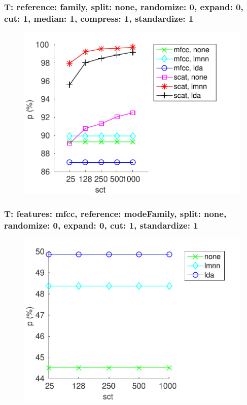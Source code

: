 \documentclass{beamer}
\begin{document}
\begin{frame}\frametitle{\small T: reference: family, split: none, randomize: 0, expand: 0, cut: 1, median: 1, compress: 1, standardize: 1}
\begin{center}
\begin{figure}
\centering
\includegraphics[width=\textwidth,height=0.8\textheight,keepaspectratio]{./figures/Fig145.pdf}
\label{refaSpnoRa0Ex0Cu1Me1Co1St1}
\end{figure}
\end{center}


\end{frame}

\begin{frame}\frametitle{\small T: features: mfcc, reference: modeFamily, split: none, randomize: 0, expand: 0, cut: 1, standardize: 1}
\begin{center}
\begin{figure}
\centering
\includegraphics[width=\textwidth,height=0.8\textheight,keepaspectratio]{./figures/Fig146.pdf}
\label{femfRemofaSpnoRa0Ex0Cu1St1}
\end{figure}
\end{center}


\end{frame}
\end{document}
